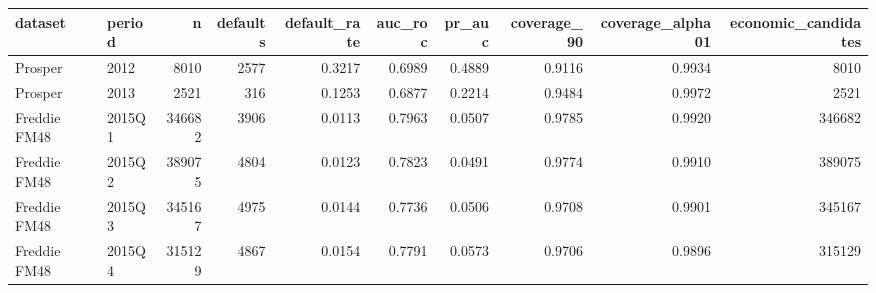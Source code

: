 \begin{tabular}{llrrrrrrrr}
\toprule
dataset & period & n & defaults & default\_rate & auc\_roc & pr\_auc & coverage\_90 & coverage\_alpha01 & economic\_candidates \\
\midrule
Prosper & 2012 & 8010 & 2577 & 0.3217 & 0.6989 & 0.4889 & 0.9116 & 0.9934 & 8010 \\
Prosper & 2013 & 2521 & 316 & 0.1253 & 0.6877 & 0.2214 & 0.9484 & 0.9972 & 2521 \\
Freddie FM48 & 2015Q1 & 346682 & 3906 & 0.0113 & 0.7963 & 0.0507 & 0.9785 & 0.9920 & 346682 \\
Freddie FM48 & 2015Q2 & 389075 & 4804 & 0.0123 & 0.7823 & 0.0491 & 0.9774 & 0.9910 & 389075 \\
Freddie FM48 & 2015Q3 & 345167 & 4975 & 0.0144 & 0.7736 & 0.0506 & 0.9708 & 0.9901 & 345167 \\
Freddie FM48 & 2015Q4 & 315129 & 4867 & 0.0154 & 0.7791 & 0.0573 & 0.9706 & 0.9896 & 315129 \\
\bottomrule
\end{tabular}
